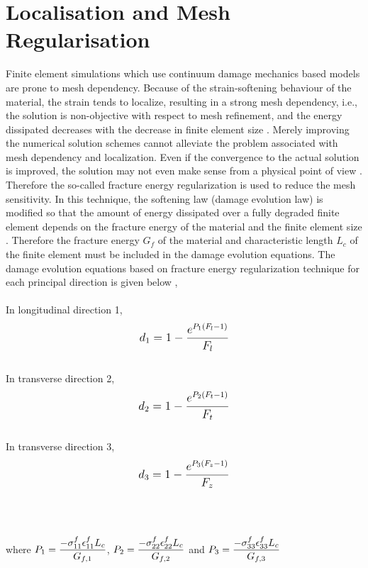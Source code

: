 \documentclass[12pt,a4paper,twoside,openright]{report}
\begin{document}
\section{Localisation and Mesh Regularisation}\label{Mesh Regularisation}
\indent\indent\indent Finite element simulations which use continuum damage mechanics based models are prone to mesh dependency.  Because of the strain-softening behaviour of the material, the strain tends to localize, resulting in a strong mesh dependency, i.e., the solution is non-objective with respect to mesh refinement, and the energy dissipated decreases with the decrease in finite element size \citep{lapczyk2007progressive}. Merely improving the numerical solution schemes cannot alleviate the problem associated with mesh dependency and localization. Even if the convergence to the actual solution is improved, the solution may not even make sense from a physical point of view \citep{peerlings1999enhanced}. Therefore the so-called fracture energy regularization is used to reduce the mesh sensitivity. In this technique, the softening law (damage evolution law) is modified so that the amount of energy dissipated over a fully degraded finite element depends on the fracture energy of the material and the finite element size \citep{cervera2006smeared}. Therefore the fracture energy $G_f$ of the material and characteristic length $L_{c}$ of the finite element must be included in the damage evolution equations. The damage evolution equations based on fracture energy regularization technique for each principal direction is given below \citep{wang2009three}, \\
\\
In longitudinal direction 1,
\begin{equation}
\label{d1}
\mathlarger{d_{1} = 1 - \frac{e^{P_{1}(F_{l} - 1)}}{F_{l}}}
\end{equation}
\\
In transverse direction 2,
\begin{equation}
\label{d2}  
\mathlarger{d_{2} = 1 - \frac{e^{P_{2}(F_{t} - 1)}}{F_{t}}}
\end{equation}
\\
In transverse direction 3,
\begin{equation}
\label{d3} 
\mathlarger{d_{3} = 1 - \frac{e^{P_{3}(F_{z} - 1)}}{F_{z}}}
\end{equation}
\\
\\
\\
where $\mathlarger{P_{1} = \frac{-\sigma_{11}^{f}\epsilon_{11}^{f}L_{c}}{G_{f,1}}}$, $\mathlarger{P_{2} = \frac{-\sigma_{22}^{f}\epsilon_{22}^{f}L_{c}}{G_{f,2}}}$ and $\mathlarger{P_{3} = \frac{-\sigma_{33}^{f}\epsilon_{33}^{f}L_{c}}{G_{f,3}}}$ 
\end{document}
